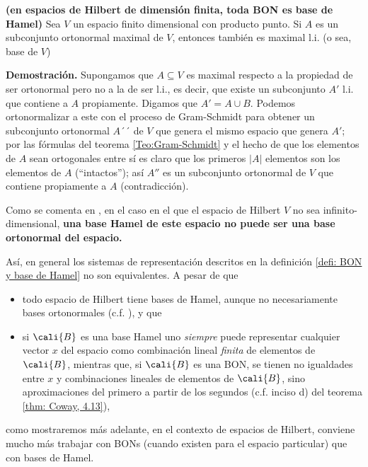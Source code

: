 \begin{prop}
\textbf{(en espacios de Hilbert de dimensión finita, toda BON es
base de Hamel)}
\label{prop: en dimension finita toda BON es base de Hamel}
Sea $V$ un espacio finito dimensional
con producto punto. Si $A$
es un subconjunto ortonormal maximal de $V$, entonces
también es maximal l.i. (o sea, base de $V$)
\end{prop}
\noindent
\textbf{Demostración.}
Supongamos que $A \subseteq V$ es maximal 
respecto a la propiedad de ser ortonormal pero
no a la de ser l.i., es decir, que existe
un subconjunto $A'$ l.i. que contiene a $A$ propiamente.
Digamos que $A' = A \cup B$.
Podemos ortonormalizar a este con el proceso de Gram-Schmidt
para obtener un subconjunto ortonormal $A´´$ de
$V$ que genera 
el mismo espacio que genera $A'$;
por las fórmulas del teorema \ref{Teo:Gram-Schmidt}
y el hecho de que los elementos de $A$ sean ortogonales
entre sí es claro que los primeros $|A|$ elementos
son los elementos de $A$ (``intactos''); así $A''$
es un subconjunto ortonormal de $V$ que contiene propiamente
a $A$ (contradicción).
\QEDB
\vspace{0.2cm}


Como se comenta en \cite{mse1},
en el caso en el que el espacio de Hilbert $V$
no sea infinito-dimensional, \textbf{una base 
Hamel de este espacio no puede ser una
base ortonormal del espacio.}

Así, en general los sistemas de representación
descritos en la definición 
\ref{defi: BON y base de Hamel} no son equivalentes.
A pesar de que
\begin{itemize}
	\item todo espacio de Hilbert tiene bases de Hamel, aunque
	no necesariamente bases ortonormales (c.f. 
	\cite{mse2}), y que
	
	\item si $\cali{B}$ es una base Hamel uno \textit{siempre}
	puede representar cualquier vector $x$ del espacio como combinación
	lineal \textit{finita} de elementos de $\cali{B}$, mientras que,
	si $\cali{B}$ es una BON, se tienen no igualdades entre 
	$x$ y combinaciones lineales de elementos de $\cali{B}$, sino aproximaciones
	del primero a partir de los segundos (c.f. inciso d)
	del teorema \ref{thm: Coway, 4.13}),
\end{itemize}

\noindent
como mostraremos más adelante, en el contexto de
espacios de Hilbert, conviene mucho más trabajar con BONs
(cuando existen para el espacio particular)
que con bases de Hamel. 


